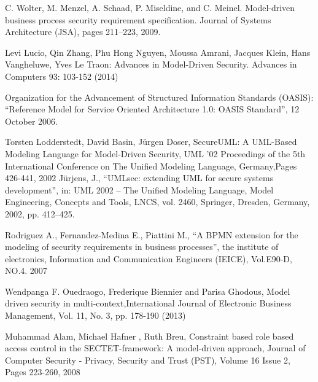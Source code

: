 \documentclass[runningheads,a4paper]{llncs}
\begin{document}
\begin{thebibliography}{4}
C. Wolter, M. Menzel, A. Schaad, P. Miseldine, and C. Meinel. Model-driven business process security requirement specification. Journal of Systems Architecture (JSA), pages 211–223, 2009.

 Levi Lucio, Qin Zhang, Phu Hong Nguyen, Moussa Amrani, Jacques Klein, Hans Vangheluwe, Yves Le Traon: Advances in Model-Driven Security. Advances in Computers 93: 103-152 (2014)

Organization for the Advancement of Structured Information Standards (OASIS): “Reference Model for Service Oriented Architecture 1.0: OASIS Standard”, 12 October 2006.


Torsten Lodderstedt, David Basin, Jürgen Doser, SecureUML: A UML-Based Modeling Language for Model-Driven Security, UML '02 Proceedings of the 5th International Conference on The Unified Modeling Language,  Germany,Pages 426-441, 2002
Jürjens, J., “UMLsec: extending UML for secure systems development”, in: UML 2002 – The Unified Modeling Language, Model Engineering, Concepts and Tools, LNCS, vol. 2460, Springer, Dresden, Germany, 2002, pp. 412–425.
    
    
 Rodriguez A., Fernandez-Medina E., Piattini M., “A BPMN extension for the modeling of security requirements in business processes”, the institute of electronics, Information and Communication Engineers (IEICE), Vol.E90-D, NO.4. 2007



 Wendpanga F. Ouedraogo, Frederique Biennier and Parisa Ghodous, Model driven security in multi-context,International Journal of Electronic Business Management, Vol. 11, No. 3, pp. 178-190 (2013)  


 Muhammad Alam, Michael Hafner ,	Ruth Breu, Constraint based role based access control in the SECTET-framework: A model-driven approach, Journal of Computer Security - Privacy, Security and Trust (PST), Volume 16 Issue 2, Pages 223-260, 2008
\end{thebibliography}
\end{document}
